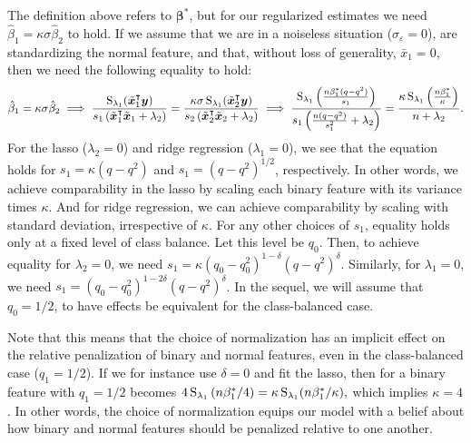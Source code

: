 The definition above refers to \(\bm{\beta}^*\), but for our regularized estimates we need
\(\hat{\beta}_1 = \kappa\sigma\hat{\beta}_2\) to hold. If we assume that we are in a
noiseless situation (\(\sigma_\varepsilon = 0\)), are standardizing the normal feature, and
that, without loss of generality, \(\bar{x}_1 = 0\), then we need the following equality to
hold:
%
\begin{equation}
  \label{eq:comparable-effects}
  \hat{\beta}_1 = \kappa\sigma \hat{\beta}_2 \implies \frac{\operatorname{S}_{\lambda_1}(\tilde{\bm{x}}_1^\intercal \bm{y})}{s_1\left(\tilde{\bm{x}}_1^\intercal \tilde{\bm{x}}_1 + \lambda_2\right)}  =\frac{\kappa\sigma \operatorname{S}_{\lambda_1}(\tilde{\bm{x}}_2^\intercal \bm{y})}{s_2\left(\tilde{\bm{x}}_2^\intercal \tilde{\bm{x}}_2 + \lambda_2\right)}  \implies \frac{\operatorname{S}_{\lambda_1}\left(\frac{n\beta_1^* (q - q^2)}{s_1}\right)}{s_1\left(\frac{n(q - q^2)}{s_1^2} + \lambda_2\right)} = \frac{\kappa \operatorname{S}_{\lambda_1}\left(\frac{n\beta_1^*}{\kappa} \right)}{n + \lambda_2}.
\end{equation}
For the lasso (\(\lambda_2 = 0\)) and ridge regression (\(\lambda_1=0\)), we see that the
equation holds for \(s_1 = \kappa (q - q^2)\) and \(s_1 = (q - q^2)^{1/2}\), respectively.
In other words, we achieve comparability in the lasso by scaling each binary feature with
its variance times \(\kappa\). And for ridge regression, we can achieve comparability by
scaling with standard deviation, irrespective of \(\kappa\). For any other choices of
\(s_1\), equality holds only at a fixed level of class balance. Let this level be \(q_0\).
Then, to achieve equality for \(\lambda_2 = 0\), we need \(s_1 =\kappa (q_0 - q_0^2)^{1 -
  \delta}(q - q^2)^\delta\). Similarly, for \(\lambda_1 = 0\), we need \(s_1 = (q_0 -
q_0^2)^{1 - 2\delta} (q - q^2)^\delta\). In the sequel, we will assume that \(q_0 = 1/2\),
to have effects be equivalent for the class-balanced case.

Note that this means that the choice of normalization has an implicit effect on the
relative penalization of binary and normal features, even in the class-balanced case (\(q_1
= 1/2\)). If we for instance use \(\delta=0\) and fit the lasso, then
 for a binary feature with \(q_1=1/2\) becomes
\(4\operatorname{S}_{\lambda_1}\left(n\beta_1^*/4\right) = \kappa \operatorname{S}_{\lambda_1}(n\beta_1^*/\kappa ),\)
which implies \(\kappa = 4\). In other words, the choice of normalization equips our model
with a belief about how binary and normal features should be penalized relative to one
another.

